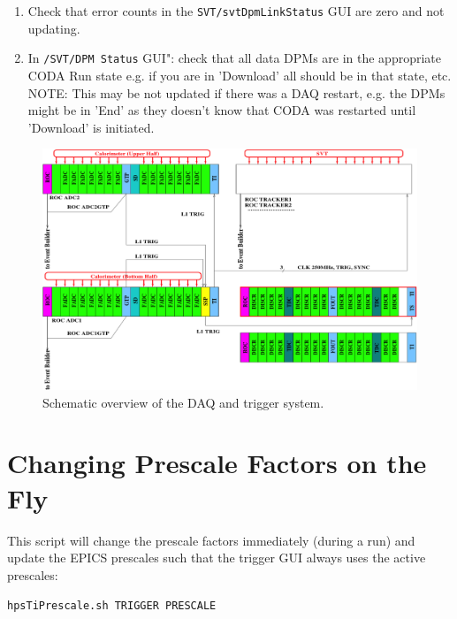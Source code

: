 \documentclass[12pt]{article}
\begin{document}
\begin{enumerate}
\begin{enumerate}
\item
Check that error counts in the \texttt{SVT/svtDpmLinkStatus} GUI are zero and not updating.

\item
In \texttt{/SVT/DPM Status} GUI": check that all data DPMs are in the appropriate CODA Run state e.g. if you are in 'Download' all should be in that state, etc. 
\newline NOTE: This may be not updated if there was a DAQ restart, e.g. the DPMs might be in 'End' as they doesn't know that CODA was restarted until 'Download' is initiated.
\end{enumerate}
\end{enumerate}




\begin{figure}[htbp]
\begin{center}
    \includegraphics[width=\textwidth]{daq.png}
\caption{Schematic overview of the DAQ and trigger system.}
\label{fig:daq}
\end{center}
\end{figure}

\newpage

\appendix
\section{Changing Prescale Factors on the Fly}
This script will change the prescale factors immediately (during a run) and update the EPICS prescales such that the trigger GUI always uses the active prescales:\newline
\centerline{\texttt{hpsTiPrescale.sh TRIGGER PRESCALE}}
\end{document}

